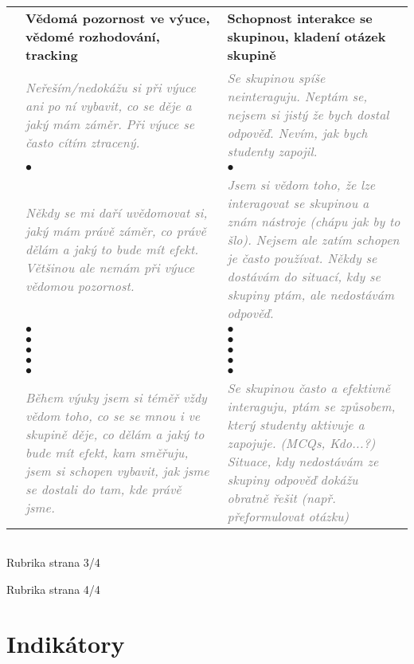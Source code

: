 \documentclass[twoside,openany,10pt]{book}
\newcommand{\note}[1]{\textcolor{gray}{\small\itshape #1}}
\begin{document}
\newpage
\begin{tabular}{@{}l@{\hspace{5pt}}C{0.45\textwidth} C{0.45\textwidth} @{}}
&
\bfseries Vědomá pozornost ve výuce, vědomé rozhodování, tracking &
\bfseries Schopnost interakce se skupinou, kladení otázek skupině \\
 &
\note{Neřeším/nedokážu si při výuce ani po ní vybavit, co se děje a jaký mám záměr. Při výuce se často cítím ztracený.} &
\note{Se skupinou spíše neinteraguju. Neptám se, nejsem si jistý že bych dostal odpověď. Nevím, jak bych studenty zapojil.} \\
& $\bullet$ & $\bullet$ \\
 &
\note{Někdy se mi daří uvědomovat si, jaký mám právě záměr, co právě dělám a jaký to bude mít efekt. Většinou ale nemám při výuce vědomou pozornost.} &
\note{Jsem si vědom toho, že lze interagovat se skupinou a znám nástroje (chápu jak by to šlo). Nejsem ale zatím schopen je často používat. Někdy se dostávám do situací, kdy se skupiny ptám, ale nedostávám odpověď.} \\
& $\bullet$ & $\bullet$ \\
& $\bullet$ & $\bullet$ \\
& $\bullet$ & $\bullet$ \\
& $\bullet$ & $\bullet$ \\
& $\bullet$ & $\bullet$ \\
 &
\note{Během výuky jsem si téměř vždy vědom toho, co se se mnou i ve skupině děje, co dělám a jaký to bude mít efekt, kam směřuju, jsem si schopen vybavit, jak jsme se dostali do tam, kde právě jsme.} &
\note{Se skupinou často a efektivně interaguju, ptám se způsobem, který studenty aktivuje a zapojuje. (MCQs, Kdo...?) Situace, kdy nedostávám ze skupiny odpověď dokážu obratně řešit (např. přeformulovat otázku)}
\end{tabular}

\newpage
\begin{tabularx}{\textwidth}{Xcc}

\end{tabularx}

\newpage
Rubrika strana 3/4

\newpage
Rubrika strana 4/4

\chapter*{Indikátory}
\label{indikatory}
\end{document}
